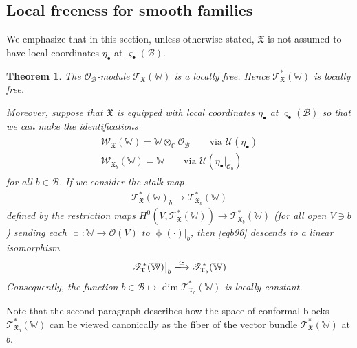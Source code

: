 \documentclass[11pt,b5paper,notitlepage]{article}
\theoremstyle{definition}
\theoremstyle{plain}
\newtheorem{thm}[df]{Theorem}
\newcommand{\mc}{\mathcal}
\newcommand{\scr}{\mathscr}
\newcommand{\sgm}{\varsigma}
\newcommand{\blt}{\bullet}
\newcommand{\Wbb}{\mathbb W}
\newcommand{\Cbb}{\mathbb C}
\newcommand{\<}{\left\langle}
\renewcommand{\>}{\right\rangle}
\newcommand{\MO}{\mathcal{O}}
\newcommand{\MU}{\mathcal{U}}
\newcommand{\MC}{\mathcal{C}}
\newcommand{\MB}{\mathcal{B}}
\newcommand{\fx}{\mathfrak{X}}
\newcommand{\ST}{\mathscr{T}}
\newcommand{\SW}{\mathscr{W}}
\numberwithin{equation}{section}
\begin{document}
\subsection{Local freeness for smooth families}\label{lbb69}

We emphasize that in this section, unless otherwise stated, $\fx$ is not assumed to have local coordinates $\eta_\blt$ at $\sgm_\blt(\MB)$.


\begin{thm}\label{lbb35}
The $\MO_\MB$-module $\ST_\fx(\Wbb)$ is a locally free. Hence $\scr T_\fx^*(\Wbb)$ is locally free. 

Moreover, suppose that $\fx$ is equipped with local coordinates $\eta_\blt$ at $\sgm_\blt(\MB)$ so that we can make the identifications
\begin{gather}\label{eqb98}
\begin{gathered}
\SW_\fx(\Wbb)=\Wbb\otimes_\Cbb\MO_\MB\qquad\text{via }\mc U(\eta_\blt)\\
\SW_{\fx_b}(\Wbb)=\Wbb\qquad\text{via }\MU(\eta_\blt|_{\MC_b})
\end{gathered}
\end{gather}
for all $b\in\MB$. If we consider the stalk map
\begin{align}\label{eqb96}
\scr T_{\fx}^*(\Wbb)_b\rightarrow\scr T_{\fx_b}^*(\Wbb)
\end{align}
defined by the restriction maps $H^0(V,\scr T_\fx^*(\Wbb))\rightarrow\scr T_{\fx_b}^*(\Wbb)$ (for all open $V\ni b$) sending each $\upphi:\Wbb\rightarrow\mc O(V)$ to $\upphi(\cdot)|_b$, then \eqref{eqb96} descends to a linear isomorphism
\begin{align}\label{eqb97}
\scr T_\fx^*(\Wbb)\big|_b\xlongrightarrow{\simeq}\scr T_{\fx_b}^*(\Wbb)
\end{align}
Consequently, the function $b\in\MB\mapsto \dim \scr T_{\fx_b}^*(\Wbb)$ is locally constant. 
\end{thm}

Note that the second paragraph describes how the space of conformal blocks $\scr T_{\fx_b}^*(\Wbb)$ can be viewed canonically as the fiber of the vector bundle $\scr T_\fx^*(\Wbb)$ at $b$.
\end{document}
